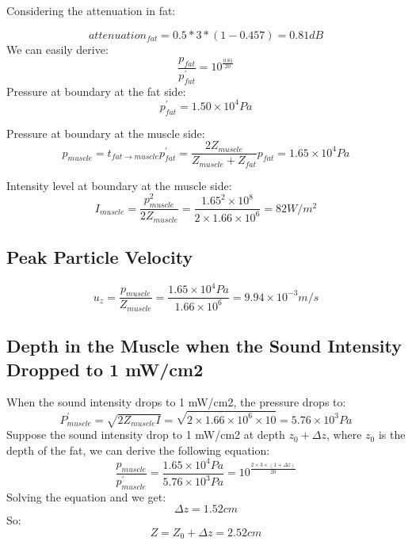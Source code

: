 \documentclass[11pt,a4paper,BCOR12mm, headexclude, footexclude, twoside, openright]{scrartcl}
\numberwithin{equation}{section} %
\numberwithin{figure}{section} %
\numberwithin{table}{section} %
\begin{document}
Considering the attenuation in fat:

\begin{equation}
    attenuation_{fat} = 0.5*3*(1-0.457)=0.81dB
\end{equation}
We can easily derive:
\begin{equation}
    \frac{p_{fat}}{p^\prime_{fat}} = 10^\frac{0.81}{20}
\end{equation}
Pressure at boundary at the fat side:
\begin{equation}
    p^\prime_{fat}=1.50\times10^4Pa
\end{equation}

Pressure at boundary at the muscle side:
\begin{equation}
    p_{muscle} = t_{fat\rightarrow muscle}p^\prime_{fat}=\frac{2Z_{muscle}}{Z_{muscle} + Z_{fat}}p_{fat}=1.65\times10^4Pa
\end{equation}

Intensity level at boundary at the muscle side:
\begin{equation}
    I_{muscle} = \frac{p_{muscle}^2}{2Z_{muscle}} = \frac{1.65^2\times10^8}{2\times1.66\times10^6}=82W/m^2
\end{equation}

\subsection{Peak Particle Velocity} 
\begin{equation}
    u_z = \frac{p_{muscle}}{Z_{muscle}} = \frac{1.65\times10^4Pa}{1.66\times10^6}=9.94\times10^{-3}m/s
\end{equation}

\subsection{Depth in the Muscle when the Sound Intensity Dropped to 1 mW/cm2 } 

When the sound intensity drops to 1 mW/cm2, the pressure drops to:
\begin{equation}
    P^\prime_{muscle} = \sqrt{2Z_{muscle}I}=  \sqrt{2\times1.66\times10^6\times10}=5.76\times10^3Pa
\end{equation}
Suppose the sound intensity drop to 1 mW/cm2 at depth $z_0+\Delta z$, where $z_0$ is the depth of the fat, we can derive the following equation:
\begin{equation}
    \frac{p_{muscle}}{p^\prime_{muscle}} =\frac{1.65\times10^4Pa}{5.76\times10^3Pa}= 10^\frac{2\times3\times(1+\Delta z)}{20}
\end{equation}
Solving the equation and we get:
\begin{equation}
    \Delta z= 1.52cm
\end{equation}
So:
\begin{equation}
    Z = Z_0 + \Delta z= 2.52cm
\end{equation}
\end{document}
